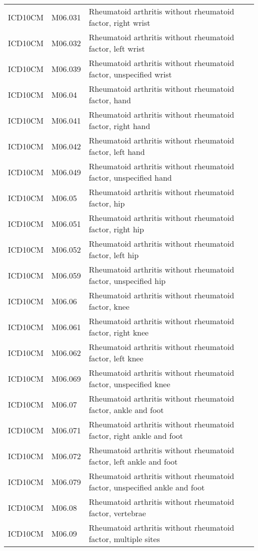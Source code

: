 \begin{table}[ht]
\begin{tabular}{lll}
  ICD10CM & M06.031 & Rheumatoid arthritis without rheumatoid factor, right wrist \\ 
  ICD10CM & M06.032 & Rheumatoid arthritis without rheumatoid factor, left wrist \\ 
  ICD10CM & M06.039 & Rheumatoid arthritis without rheumatoid factor, unspecified wrist \\ 
  ICD10CM & M06.04 & Rheumatoid arthritis without rheumatoid factor, hand \\ 
  ICD10CM & M06.041 & Rheumatoid arthritis without rheumatoid factor, right hand \\ 
  ICD10CM & M06.042 & Rheumatoid arthritis without rheumatoid factor, left hand \\ 
  ICD10CM & M06.049 & Rheumatoid arthritis without rheumatoid factor, unspecified hand \\ 
  ICD10CM & M06.05 & Rheumatoid arthritis without rheumatoid factor, hip \\ 
  ICD10CM & M06.051 & Rheumatoid arthritis without rheumatoid factor, right hip \\ 
  ICD10CM & M06.052 & Rheumatoid arthritis without rheumatoid factor, left hip \\ 
  ICD10CM & M06.059 & Rheumatoid arthritis without rheumatoid factor, unspecified hip \\ 
  ICD10CM & M06.06 & Rheumatoid arthritis without rheumatoid factor, knee \\ 
  ICD10CM & M06.061 & Rheumatoid arthritis without rheumatoid factor, right knee \\ 
  ICD10CM & M06.062 & Rheumatoid arthritis without rheumatoid factor, left knee \\ 
  ICD10CM & M06.069 & Rheumatoid arthritis without rheumatoid factor, unspecified knee \\ 
  ICD10CM & M06.07 & Rheumatoid arthritis without rheumatoid factor, ankle and foot \\ 
  ICD10CM & M06.071 & Rheumatoid arthritis without rheumatoid factor, right ankle and foot \\ 
  ICD10CM & M06.072 & Rheumatoid arthritis without rheumatoid factor, left ankle and foot \\ 
  ICD10CM & M06.079 & Rheumatoid arthritis without rheumatoid factor, unspecified ankle and foot \\ 
  ICD10CM & M06.08 & Rheumatoid arthritis without rheumatoid factor, vertebrae \\ 
  ICD10CM & M06.09 & Rheumatoid arthritis without rheumatoid factor, multiple sites \\ 

\end{tabular}
\end{table}
